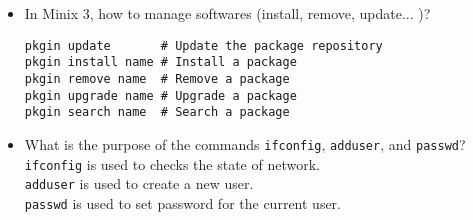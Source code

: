\documentclass{article}
\begin{document}
\begin{itemize}
\item In Minix 3, how to manage softwares (install, remove, update... )?
\begin{verbatim}
pkgin update       # Update the package repository
pkgin install name # Install a package
pkgin remove name  # Remove a package
pkgin upgrade name # Upgrade a package
pkgin search name  # Search a package
\end{verbatim}

\item What is the purpose of the commands \texttt{ifconfig}, \texttt{adduser}, and \texttt{passwd}?\\[0.5em]
\texttt{ifconfig} is used to checks the state of network. \\[0.5em]
\texttt{adduser} is used to create a new user. \\[0.5em]
\texttt{passwd} is used to set password for the current user. 
\end{itemize}
\end{document}
